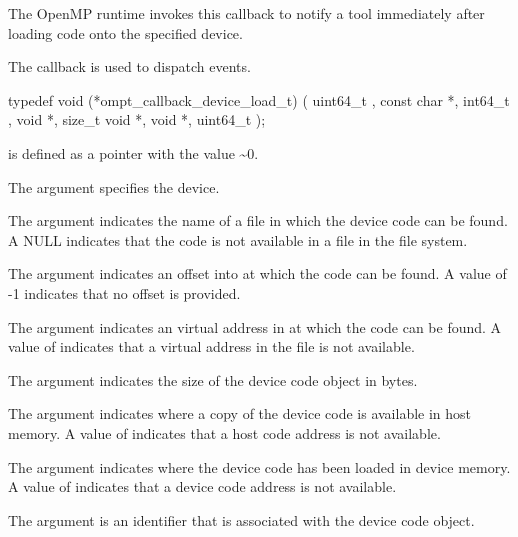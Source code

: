 \label{sec:ompt_callback_device_load_t}

\summary
The OpenMP runtime invokes this callback to notify a tool immediately after loading code onto the specified device.

The  callback is used to dispatch
 events.

\format


\begin{ccppspecific}
\begin{omptCallback}
typedef void (*ompt_callback_device_load_t) (
  uint64_t ,
  const char *,
  int64_t ,
  void *,
  size_t 
  void *,
  void *,
  uint64_t 
);
\end{omptCallback}

\end{ccppspecific}
 is defined as a pointer with the value \textasciitilde 0.


\argdesc
The argument  specifies the device.

The argument  indicates the name of a file in which the device code can be found. A NULL  indicates that the code is not available in a file in the file system.

The argument  indicates an offset into  at which the code can be found. A value of -1 indicates that
no offset is provided.

The argument  indicates an virtual address in  at which the code can be found.
A value of  indicates that a virtual address in the file is not 
available.

The argument  indicates the size of the device code object in bytes.

The argument  indicates where a copy of the device code is available in host memory.
A value of  indicates that a host code address is not available.

The argument  indicates where the device code has been loaded in device memory.
A value of  indicates that a device code address is not available.

The argument  is an identifier that is associated with the device code object.


